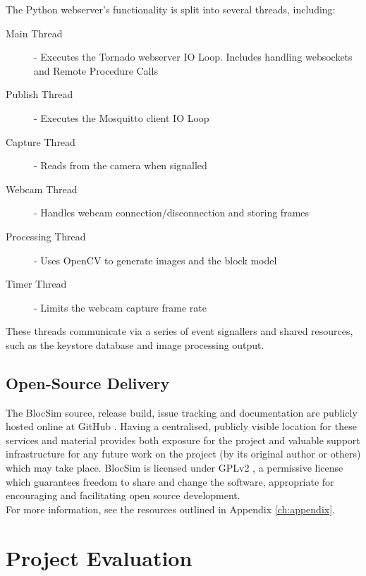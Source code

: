 
The Python webserver's functionality is split into several threads, including:

\begin{description}
	\item[Main Thread] - Executes the Tornado webserver IO Loop. Includes handling websockets and Remote Procedure Calls
	\item[Publish Thread] - Executes the Mosquitto client IO Loop
	\item[Capture Thread] - Reads from the camera when signalled
	\item[Webcam Thread] - Handles webcam connection/disconnection and storing frames
	\item[Processing Thread] - Uses OpenCV to generate images and the block model
	\item[Timer Thread] - Limits the webcam capture frame rate
\end{description}

These threads communicate via a series of event signallers and shared resources, such as the keystore database and image processing output.




\section{Open-Source Delivery}

The BlocSim source, release build, issue tracking and documentation are publicly hosted online at GitHub \cite{blocsim2014}\cite{github2014}. Having a centralised, publicly visible location for these services and material provides both exposure for the project and valuable support infrastructure for any future work on the project (by its original author or others) which may take place. BlocSim is licensed under GPLv2 \cite{gplv2}, a permissive license which guarantees freedom to share and change the software, appropriate for encouraging and facilitating open source development.
\\

For more information, see the resources outlined in Appendix \ref{ch:appendix}.




\chapter{Project Evaluation}



